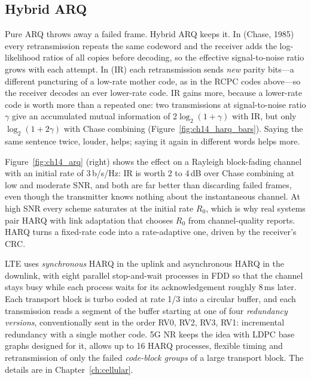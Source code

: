 \subsection{Hybrid ARQ}

Pure ARQ throws away a failed frame. Hybrid ARQ keeps it. In  (Chase, 1985) every
retransmission repeats the same codeword and the receiver adds the log-likelihood ratios of all copies
before decoding, so the effective signal-to-noise ratio grows with each attempt. In  (IR) each retransmission sends \emph{new} parity bits---a different puncturing of a low-rate
mother code, as in the RCPC codes above---so the receiver decodes an ever lower-rate code. IR gains more,
because a lower-rate code is worth more than a repeated one: two transmissions at signal-to-noise ratio
$\gamma$ give an accumulated mutual information of $2\log_2(1+\gamma)$ with IR, but only $\log_2(1+2\gamma)$
with Chase combining (Figure~\ref{fig:ch14_harq_bars}). Saying the same sentence twice, louder, helps; saying
it again in different words helps more.


Figure~\ref{fig:ch14_arq} (right) shows the effect on a Rayleigh block-fading
channel with an initial rate of 3\,b/s/Hz: IR is worth 2 to 4\,dB over Chase combining at low and moderate SNR,
and both are far better than discarding failed frames, even though the transmitter knows nothing about
the instantaneous channel. At high SNR every scheme saturates at the initial rate $R_0$, which is why real
systems pair HARQ with link adaptation that chooses $R_0$ from channel-quality reports. HARQ turns a
fixed-rate code into a rate-adaptive one, driven by the receiver's CRC.

\begin{inpractice}
LTE uses \emph{synchronous} HARQ in the uplink and asynchronous HARQ in the downlink, with eight parallel
stop-and-wait processes in FDD so that the channel stays busy while each process waits for its
acknowledgement roughly 8\,ms later. Each transport block is turbo coded at rate 1/3 into a circular buffer,
and each transmission reads a segment of the buffer starting at one of four \emph{redundancy versions},
conventionally sent in the order RV0, RV2, RV3, RV1: incremental redundancy with a single mother code.
5G NR keeps the idea with LDPC base graphs designed for it, allows up to 16 HARQ processes, flexible timing
and retransmission of only the failed \emph{code-block groups} of a large transport block. The details
are in Chapter~\ref{ch:cellular}.
\end{inpractice}


